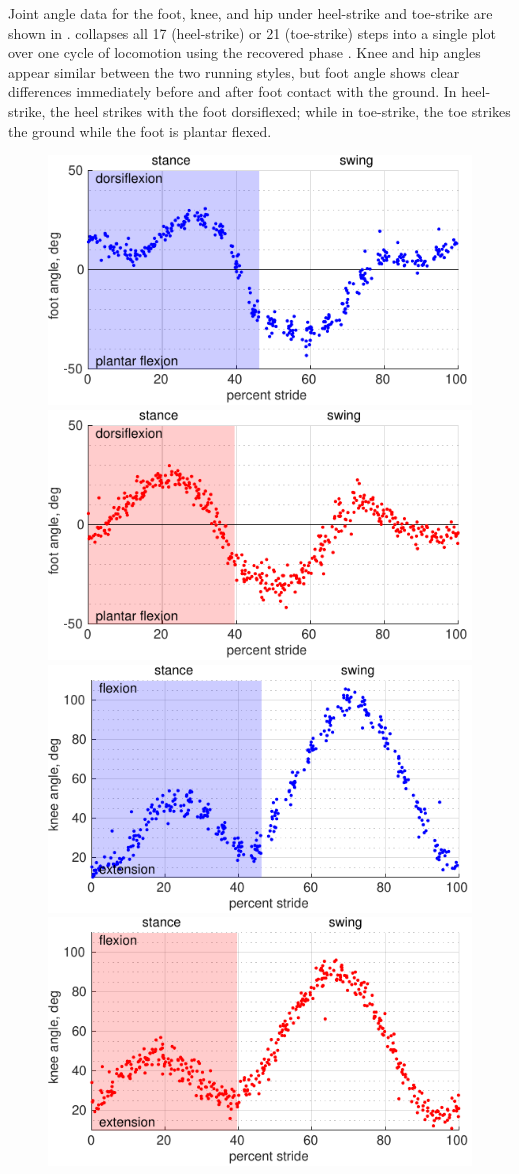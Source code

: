 Joint angle data for the foot, knee, and hip under heel-strike and toe-strike are shown in .  collapses all 17 (heel-strike) or 21 (toe-strike) steps into a single plot over one cycle of locomotion using the recovered phase \citep{revzen2008estimating}. Knee and hip angles appear similar between the two running styles, but foot angle shows clear differences immediately before and after foot contact with the ground. In heel-strike, the heel strikes with the foot dorsiflexed; while in toe-strike, the toe strikes the ground while the foot is plantar flexed.
\begin{figure}
\begin{center}
\includegraphics[width=0.49\columnwidth]{data/heel-foot-angle.pdf}
\includegraphics[width=0.49\columnwidth]{data/toe-foot-angle.pdf}\\
\includegraphics[width=0.49\columnwidth]{data/heel-knee-angle.pdf}
\includegraphics[width=0.49\columnwidth]{data/toe-knee-angle.pdf}\\

\end{center}
\end{figure}
